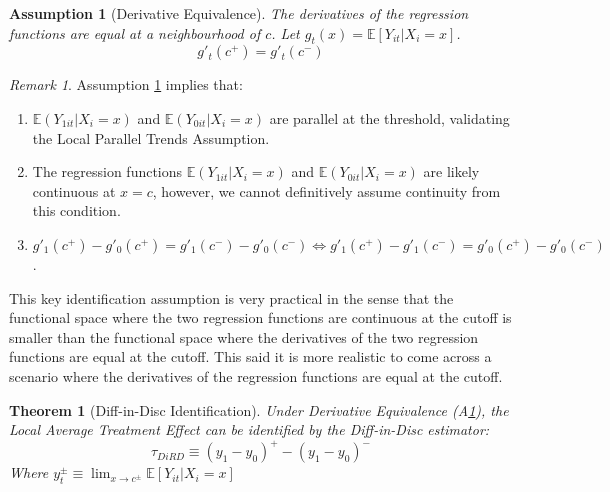 \documentclass[12pt]{article}
\theoremstyle{plain}
\newtheorem{assumption}{Assumption}
\newtheorem{theorem}{Theorem}[section]
\theoremstyle{remark}
\newtheorem*{remark}{Remark}
\begin{document}
\begin{assumption}[Derivative Equivalence]\label{eq_deriv}
        The derivatives of the regression functions are equal at a neighbourhood of $c$.
    Let $g_{t}(x) = \mathbb{E}\left[Y_{it}|X_i =x \right]$. 
    \begin{equation}
        g'_t(c^+) = g'_t(c^-)
    \end{equation}
\end{assumption}

\begin{remark}
Assumption \ref{eq_deriv} implies that:
    \begin{enumerate}[label=\roman*.]
            \item $\mathbb{E}(Y_{1it} |X_i=x)$ and $\mathbb{E}(Y_{0it} |X_i=x)$ are parallel at the threshold, validating the Local Parallel Trends Assumption.
            \item The regression functions $\mathbb{E}(Y_{1it} |X_i=x)$ and $\mathbb{E}(Y_{0it} |X_i=x)$ are likely continuous at $x=c$, however, we cannot definitively assume continuity from this condition.
            \item $g'_1(c^+)-g'_0(c^+) = g'_1(c^-)-g'_0(c^-) \Leftrightarrow g'_1(c^+)-g'_1(c^-) = g'_0(c^+)-g'_0(c^-)$.
    \end{enumerate}
\end{remark}

This key identification assumption is very practical in the sense that the functional space where the two regression functions are continuous at the cutoff is smaller than the functional space where the derivatives of the two regression functions are equal at the cutoff. This said it is more realistic to come across a scenario where the derivatives of the regression functions are equal at the cutoff.

\begin{theorem}[Diff-in-Disc Identification]
Under Derivative Equivalence (A\ref{eq_deriv}), the Local Average Treatment Effect can be identified by the Diff-in-Disc estimator:    \begin{equation}
        \tau_{DiRD}\equiv (y_1- y_0)^+ - (y_1- y_0)^-
    \end{equation}
    Where $y_{t}^\pm \equiv \lim_{x\rightarrow c^\pm} \mathbb{E}\left[Y_{it} |X_i=x\right]$
\end{theorem}
\end{document}
